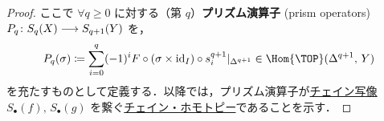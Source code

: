 \documentclass[algtopo_main]{subfiles}
\begin{document}
\begin{proof}
    ここで $\forall q\ge 0$ に対する（第 $q$）\textbf{プリズム演算子} (prism operators) $P_q \colon S_q(X) \longrightarrow S_{q+1} (Y)$ を，
    \begin{align}
        \label{eq:prism-homomorphism}
        P_q (\sigma) \coloneqq \sum_{i=0}^q (-1)^i F \circ (\sigma \times \mathrm{id}_{I}) \circ s_i^{q+1}|_{\Delta^{q+1}} \in \Hom{\TOP} (\Delta^{q+1},\, Y)
    \end{align}
    を充たすものとして定義する．以降では，プリズム演算子が\hyperref[def:chainmap]{チェイン写像} $S_\bullet(f),\, S_\bullet (g)$ を繋ぐ\hyperref[def:chainHomotopy]{チェイン・ホモトピー}であることを示す．
    
    \hrulefill

        




\end{proof}
\end{document}

